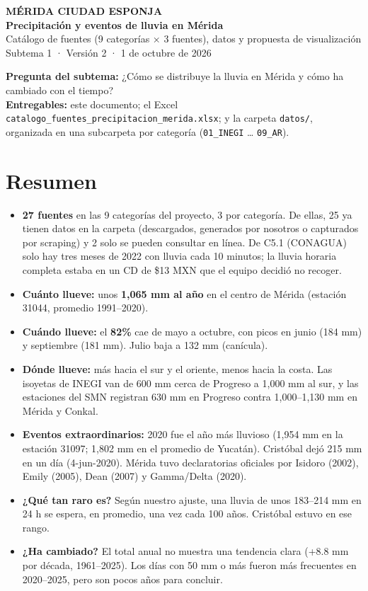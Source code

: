 \documentclass[11pt,a4paper]{article}
\begin{document}
{\color{azul}\small\bfseries MÉRIDA CIUDAD ESPONJA}\\[2pt]
{\huge\bfseries Precipitación y eventos de lluvia en Mérida}\\[4pt]
{\large\color{tinta2} Catálogo de fuentes (9 categorías × 3 fuentes), datos y propuesta de visualización}\\[6pt]
{\small\color{tinta2} Subtema 1 · Versión 2 · 1 de octubre de 2026}

\begin{nota}
\textbf{Pregunta del subtema:} ¿Cómo se distribuye la lluvia en Mérida y cómo ha cambiado con el tiempo?\\[3pt]
\textbf{Entregables:} este documento; el Excel \texttt{catalogo\_fuentes\_precipitacion\_merida.xlsx}; y la carpeta
\texttt{datos/}, organizada en una subcarpeta por categoría (\texttt{01\_INEGI} … \texttt{09\_AR}).
\end{nota}

\section{Resumen}

\begin{itemize}[leftmargin=1.2em,itemsep=2pt]
\item \textbf{27 fuentes} en las 9 categorías del proyecto, 3 por categoría. De ellas, 25 ya tienen datos en la carpeta
  (descargados, generados por nosotros o capturados por scraping) y 2 solo se pueden consultar en línea.
  De C5.1 (CONAGUA) solo hay tres meses de 2022 con lluvia cada 10 minutos; la lluvia horaria completa estaba en un CD de \$13 MXN que el equipo decidió no recoger.
\item \textbf{Cuánto llueve:} unos \textbf{1,065 mm al año} en el centro de Mérida (estación 31044, promedio 1991–2020).
\item \textbf{Cuándo llueve:} el \textbf{82\%} cae de mayo a octubre, con picos en junio (184 mm)
  y septiembre (181 mm). Julio baja a 132 mm (canícula).
\item \textbf{Dónde llueve:} más hacia el sur y el oriente, menos hacia la costa. Las isoyetas de INEGI van de 600 mm cerca de Progreso
  a 1,000 mm al sur, y las estaciones del SMN registran 630 mm en Progreso contra 1,000–1,130 mm en Mérida y Conkal.
\item \textbf{Eventos extraordinarios:} 2020 fue el año más lluvioso (1,954 mm en la estación 31097; 1,802 mm en el promedio de Yucatán).
  Cristóbal dejó 215 mm en un día (4-jun-2020). Mérida tuvo declaratorias oficiales por Isidoro (2002), Emily (2005), Dean (2007) y Gamma/Delta (2020).
\item \textbf{¿Qué tan raro es?} Según nuestro ajuste, una lluvia de unos 183–214 mm en 24 h se espera, en promedio, una vez cada 100 años.
  Cristóbal estuvo en ese rango.
\item \textbf{¿Ha cambiado?} El total anual no muestra una tendencia clara (+8.8 mm por década, 1961–2025). Los días con 50 mm o más
  fueron más frecuentes en 2020–2025, pero son pocos años para concluir.
\end{itemize}
\end{document}
